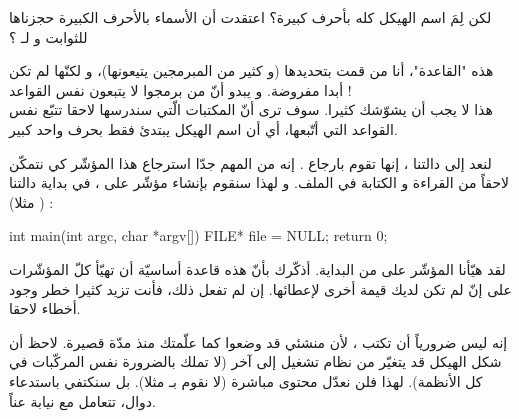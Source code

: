 \begin{question}
  لكن لِمَ اسم الهيكل كله بأحرف كبيرة؟ اعتقدت أن الأسماء بالأحرف الكبيرة حجزناها للثوابت و لـ ؟
\end{question}

هذه "القاعدة"، أنا من قمت بتحديدها (و كثير من المبرمجين يتيعونها)، و لكنّها لم تكن أبدا مفروضة. و يبدو أنّ من برمجوا
لا يتبعون نفس القواعد !\\
هذا لا يجب أن يشوّشك كثيرا. سوف ترى أنّ المكتبات الّتي سندرسها لاحقا تتبّع نفس القواعد التي أتّبعها، أي أن اسم الهيكل يبتدئ فقط بحرف واحد كبير.

لنعد إلى دالتنا
،
إنها تقوم بارجاع
.
إنه من المهم جدّا استرجاع هذا المؤشّر كي نتمكّن لاحقاً من القراءة و الكتابة في الملف.  و لهذا سنقوم بإنشاء مؤشّر على
،
في بداية دالتنا
(
مثلا) :

\begin{Csource}
int main(int argc, char *argv[])
{
	FILE* file = NULL;
	return 0;
}
\end{Csource}

لقد هيّأنا المؤشّر على
من البداية. أذكّرك بأنّ هذه قاعدة أساسيّة أن تهيّأ كلّ المؤشّرات على
إنّ لم تكن لديك قيمة أخرى لإعطائها. إن لم تفعل ذلك، فأنت تزيد كثيرا خطر وجود أخطاء لاحقا.

\begin{information}
  إنه ليس ضرورياً أن تكتب
،
لأن منشئي
قد وضعوا
كما علّمتك منذ مدّة قصيرة.
لاحظ أن شكل الهيكل قد يتغيّر من نظام تشغيل إلى آخر (لا تملك بالضرورة نفس المركّبات في كل الأنظمة). لهذا فلن نعدّل محتوى
مباشرة (لا نقوم بـ
مثلا). بل سنكتفي باستدعاء دوال، تتعامل مع
نيابة عناً.
\end{information}

